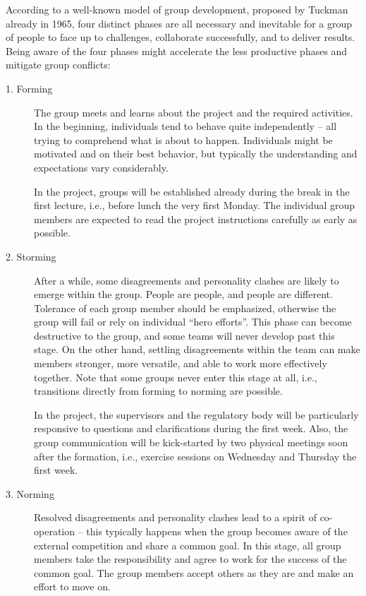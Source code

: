 \documentclass{scrreprt}
\begin{document}
According to a well-known model of group development, proposed by Tuckman already in 1965, four distinct phases are all necessary and inevitable for a group of people to face up to challenges, collaborate successfully, and to  deliver results. Being aware of the four phases might accelerate the less productive phases and mitigate group conflicts:
\begin{description}
\item[1. Forming] The group meets and learns about the project and the required activities. In the beginning, individuals tend to behave quite independently -- all trying to comprehend what is about to happen. Individuals might be motivated and on their best behavior, but typically the understanding and expectations vary considerably. 

In the project, groups will be established already during the break in the first lecture, i.e., before lunch the very first Monday. The individual group members are expected to read the project instructions carefully as early as possible.
\item[2. Storming] After a while, some disagreements and personality clashes are likely to emerge within the group. People are people, and people are different. Tolerance of each group member should be emphasized, otherwise the group will fail or rely on individual ``hero efforts''. This phase can become destructive to the group, and some teams will never develop past this stage. On the other hand, settling disagreements within the team can make members stronger, more versatile, and able to work more effectively together. Note that some groups never enter this stage at all, i.e., transitions directly from forming to norming are possible.

In the project, the supervisors and the regulatory body will be particularly responsive to questions and clarifications during the first week. Also, the group communication will be kick-started by two physical meetings soon after the formation, i.e., exercise sessions on Wednesday and Thursday the first week.

\item[3. Norming] Resolved disagreements and personality clashes lead to a spirit of co-operation -- this typically happens when the group becomes aware of the external competition and share a common goal. In this stage, all group members take the responsibility and agree to work for the success of the common goal. The group members accept others as they are and make an effort to move on. 


\end{description}
\end{document}
